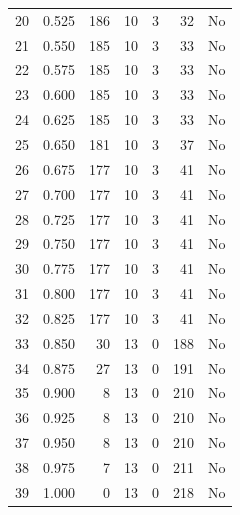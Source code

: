 \documentclass[a4paper,twoside,12pt]{book}
\begin{document}
\begin{appendices}
\begin{table}
\begin{tabular}{lrrrrrl}
		20 &  0.525 &       186 &        10 &               3 &              32 &     No \\
		21 &  0.550 &       185 &        10 &               3 &              33 &     No \\
		22 &  0.575 &       185 &        10 &               3 &              33 &     No \\
		23 &  0.600 &       185 &        10 &               3 &              33 &     No \\
		24 &  0.625 &       185 &        10 &               3 &              33 &     No \\
		25 &  0.650 &       181 &        10 &               3 &              37 &     No \\
		26 &  0.675 &       177 &        10 &               3 &              41 &     No \\
		27 &  0.700 &       177 &        10 &               3 &              41 &     No \\
		28 &  0.725 &       177 &        10 &               3 &              41 &     No \\
		29 &  0.750 &       177 &        10 &               3 &              41 &     No \\
		30 &  0.775 &       177 &        10 &               3 &              41 &     No \\
		31 &  0.800 &       177 &        10 &               3 &              41 &     No \\
		32 &  0.825 &       177 &        10 &               3 &              41 &     No \\
		33 &  0.850 &        30 &        13 &               0 &             188 &     No \\
		34 &  0.875 &        27 &        13 &               0 &             191 &     No \\
		35 &  0.900 &         8 &        13 &               0 &             210 &     No \\
		36 &  0.925 &         8 &        13 &               0 &             210 &     No \\
		37 &  0.950 &         8 &        13 &               0 &             210 &     No \\
		38 &  0.975 &         7 &        13 &               0 &             211 &     No \\
		39 &  1.000 &         0 &        13 &               0 &             218 &     No \\
		\bottomrule
	\end{tabular}
\end{table} 


\end{appendices}
\end{document}
